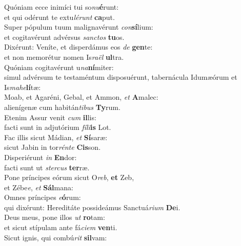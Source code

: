 \evenverse Quóniam ecce inimíci tui so\textit{nu}\textbf{é}runt:~\*\\
\evenverse et qui odérunt te extu\textit{lé}\textit{runt} \textbf{ca}put.\\
\oddverse Super pópulum tuum malignavérunt \textit{con}\textbf{sí}lium:~\*\\
\oddverse et cogitavérunt advérsus \textit{san}\textit{ctos} \textbf{tu}os.\\
\evenverse Dixérunt: Veníte, et disperdámus eos \textit{de} \textbf{gen}te:~\*\\
\evenverse et non memorétur nomen Is\textit{ra}\textit{ël} \textbf{ul}tra.\\
\oddverse Quóniam cogitavérunt u\textit{na}\textbf{ní}miter:~\*\\
\oddverse simul advérsum te testaméntum disposuérunt, tabernácula Idumæórum et Is\textit{ma}\textit{he}\textbf{lí}tæ:\\
\evenverse Moab, et Agaréni, Gebal, et Ammon, \textit{et} \textbf{A}malec:~\*\\
\evenverse alienígenæ cum habitán\textit{ti}\textit{bus} \textbf{Ty}rum.\\
\oddverse Etenim Assur venit \textit{cum} \textbf{il}lis:~\*\\
\oddverse facti sunt in adjutórium \textit{fí}\textit{li}\textbf{is} Lot.\\
\evenverse Fac illis sicut Mádian, \textit{et} \textbf{Sí}saræ:~\*\\
\evenverse sicut Jabin in tor\textit{rén}\textit{te} \textbf{Cis}son.\\
\oddverse Disperiérunt \textit{in} \textbf{En}dor:~\*\\
\oddverse facti sunt ut \textit{ster}\textit{cus} \textbf{ter}ræ.\\
\evenverse Pone príncipes eórum sicut O\textit{reb}, \textbf{et} Zeb,~\*\\
\evenverse et Zébe\textit{e}, \textit{et} \textbf{Sál}mana:\\
\oddverse Omnes príncipes \textit{e}\textbf{ó}rum:~\*\\
\oddverse qui dixérunt: Hereditáte possideámus Sanctuá\textit{ri}\textit{um} \textbf{De}i.\\
\evenverse Deus meus, pone illos \textit{ut} \textbf{ro}tam:~\*\\
\evenverse et sicut stípulam ante fá\textit{ci}\textit{em} \textbf{ven}ti.\\
\oddverse Sicut ignis, qui combú\textit{rit} \textbf{sil}vam:~\*\\
